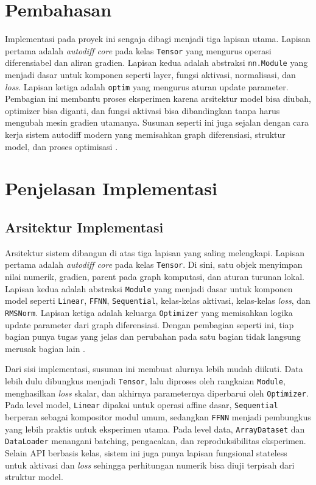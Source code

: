 \documentclass{article}
\begin{document}
\section{Pembahasan}
Implementasi pada proyek ini sengaja dibagi menjadi tiga lapisan utama. Lapisan pertama adalah \textit{autodiff core} pada kelas \texttt{Tensor} yang mengurus operasi diferensiabel dan aliran gradien. Lapisan kedua adalah abstraksi \texttt{nn.Module} yang menjadi dasar untuk komponen seperti layer, fungsi aktivasi, normalisasi, dan \textit{loss}. Lapisan ketiga adalah \texttt{optim} yang mengurus aturan update parameter. Pembagian ini membantu proses eksperimen karena arsitektur model bisa diubah, optimizer bisa diganti, dan fungsi aktivasi bisa dibandingkan tanpa harus mengubah mesin gradien utamanya. Susunan seperti ini juga sejalan dengan cara kerja sistem autodiff modern yang memisahkan graph diferensiasi, struktur model, dan proses optimisasi \citep{baydin2018ad,paszke2019pytorch}.

\section{Penjelasan Implementasi}
\subsection{Arsitektur Implementasi}
Arsitektur sistem dibangun di atas tiga lapisan yang saling melengkapi. Lapisan pertama adalah \textit{autodiff core} pada kelas \texttt{Tensor}. Di sini, satu objek menyimpan nilai numerik, gradien, parent pada graph komputasi, dan aturan turunan lokal. Lapisan kedua adalah abstraksi \texttt{Module} yang menjadi dasar untuk komponen model seperti \texttt{Linear}, \texttt{FFNN}, \texttt{Sequential}, kelas-kelas aktivasi, kelas-kelas \textit{loss}, dan \texttt{RMSNorm}. Lapisan ketiga adalah keluarga \texttt{Optimizer} yang memisahkan logika update parameter dari graph diferensiasi. Dengan pembagian seperti ini, tiap bagian punya tugas yang jelas dan perubahan pada satu bagian tidak langsung merusak bagian lain \citep{baydin2018ad,paszke2019pytorch}.

Dari sisi implementasi, susunan ini membuat alurnya lebih mudah diikuti. Data lebih dulu dibungkus menjadi \texttt{Tensor}, lalu diproses oleh rangkaian \texttt{Module}, menghasilkan \textit{loss} skalar, dan akhirnya parameternya diperbarui oleh \texttt{Optimizer}. Pada level model, \texttt{Linear} dipakai untuk operasi affine dasar, \texttt{Sequential} berperan sebagai kompositor modul umum, sedangkan \texttt{FFNN} menjadi pembungkus yang lebih praktis untuk eksperimen utama. Pada level data, \texttt{ArrayDataset} dan \texttt{DataLoader} menangani batching, pengacakan, dan reproduksibilitas eksperimen. Selain API berbasis kelas, sistem ini juga punya lapisan fungsional stateless untuk aktivasi dan \textit{loss} sehingga perhitungan numerik bisa diuji terpisah dari struktur model.
\end{document}
